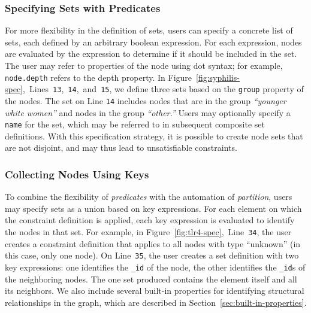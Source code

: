 \subsubsection{Specifying Sets with Predicates}
For more flexibility in the definition of sets, users
can specify a concrete list of sets, each defined by an arbitrary boolean
expression. For each expression, nodes are evaluated by the expression
to determine if it should be included in the set. The user may
refer to properties of the node using dot syntax; for example,
\texttt{node.depth} refers to the depth property. In 
Figure~\ref{fig:syphilis-spec},~Lines~\texttt{13},~\texttt{14},~and~\texttt{15},
we define three sets based on the \texttt{group} property of the nodes.
The set on Line \texttt{14} includes nodes that are in the group 
\emph{``younger white women''} and nodes in the group \emph{``other.''}
Users may optionally specify a \texttt{name} for the set, which may be 
referred to in subsequent composite set definitions. With this specification 
strategy, it is possible to create node sets that are not disjoint, 
and may thus lead to unsatisfiable constraints.

\subsubsection{Collecting Nodes Using Keys}
To combine the flexibility of \emph{predicates} with the automation of 
\emph{partition}, users may specify sets as a union based on key expressions.
For each element on which the constraint definition is applied, each key expression is
evaluated to identify the nodes in that set.
For example, in Figure~\ref{fig:tlr4-spec},~Line~\texttt{34}, the 
user creates a constraint definition that applies to all nodes with type
``unknown'' (in this case, only one node). On Line~\texttt{35}, the user 
creates a set definition with two key expressions: one identifies
the \texttt{\_id} of the node, the other identifies the \texttt{\_id}s of
the neighboring nodes. The one set produced contains the element 
itself and all its neighbors. We also include several 
built-in properties for identifying structural relationships in the 
graph, which are described in Section~\ref{sec:built-in-properties}.

